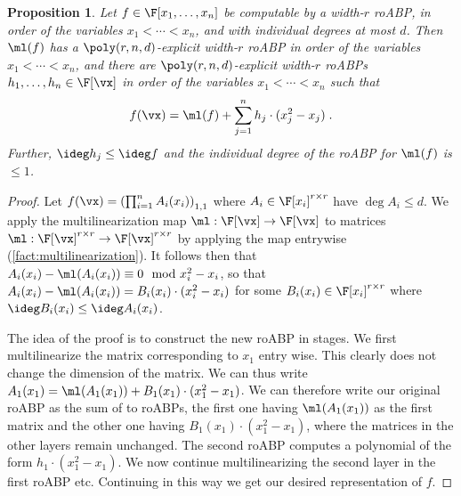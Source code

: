 \documentclass[11pt]{article}
\numberwithin{equation}{section}
\newtheorem{proposition}[theorem]{Proposition}
\theoremstyle{definition}
\theoremstyle{plain}
\begin{document}
\begin{proposition}\label{res:multilin:roABP}
%
%
Let $f\in\F[x_1,\ldots,x_n]$ be computable by a width-$r$ roABP, in order of the variables $x_1<\cdots<x_n$, and with individual degrees at most $d$. Then $\ml(f)$ has a $\poly(r,n,d)$-explicit width-$r$ roABP in order of the variables $x_1<\cdots<x_n$, and there are $\poly(r,n,d)$-explicit width-$r$ roABPs $h_1,\ldots,h_n\in\F[\vx]$ in order of the variables $x_1<\cdots<x_n$ such that
        \[
                f(\vx)=\ml(f)+\sum_{j=1}^n h_j\cdot (x_j^2-x_j)
                \;.
        \]
        Further, $\ideg h_j\le \ideg f$ and the individual degree of the roABP for $\ml(f)$ is $\le 1$.
\end{proposition}
\begin{proof}
Let  $f(\vx)=\left(\prod_{i=1}^n A_i(x_i)\right)_{1,1}$ where $A_i\in\F[x_i]^{r\times r}$ have $\deg A_i\le d$.
We apply the multilinearization map $\ml:\F[\vx]\to\F[\vx]$ to matrices $\ml:\F[\vx]^{r\times r}\to\F[\vx]^{r\times r}$ by applying the map
%
entrywise   %
(\autoref{fact:multilinearization}).  It follows then that $A_i(x_i)-\ml(A_i(x_i))\equiv 0\mod x_i^2-x_i$, so that $A_i(x_i)-\ml(A_i(x_i))=B_i(x_i)\cdot (x_i^2-x_i)$ for some $B_i(x_i)\in\F[x_i]^{r\times r}$ where $\ideg B_i(x_i)\le \ideg A_i(x_i)$.

The idea of the proof is to construct the new roABP in stages. We first multilinearize the matrix corresponding to $x_1$ entry wise. This clearly does not change the dimension of the matrix. We can thus write $A_1(x_1)=\ml(A_1(x_1))+B_1(x_1)\cdot (x_1^2-x_1)$. We can therefore write our original roABP as the sum of to roABPs, the first one having $\ml(A_1(x_1))$ as the first matrix and the other one having $B_1(x_1)\cdot (x_1^2-x_1)$, where the matrices in the other layers remain unchanged. The second roABP computes a polynomial of the form $h_1\cdot (x_1^2-x_1)$. We now continue multilinearizing the second layer in the first roABP etc. Continuing in this way we get our desired representation of $f$.


\end{proof}
\end{document}
